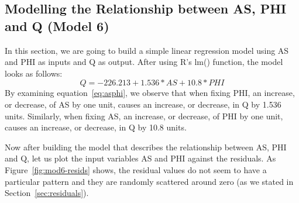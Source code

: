 \documentclass[a4paper,12pt, english]{article}
\begin{document}
\subsection{Modelling the Relationship between AS, PHI and Q (Model 6)} \label{sec:asphimodel}
In this section, we are going to build a simple linear regression model using AS and PHI as inputs and Q as output. After using R's lm() function, the model looks as follows:\\
\begin{equation}
\label{eq:asphi}
Q = -226.213  +      1.536*AS   +    10.8*PHI
\end{equation}       
By examining equation~\ref{eq:asphi}, we observe that when fixing PHI, an increase, or decrease, of AS by one unit, causes an increase, or decrease, in Q by 1.536 units.
Similarly, when fixing AS, an increase, or decrease, of PHI by one unit, causes an increase, or decrease, in Q by 10.8 units.

Now after building the model that describes the relationship between AS, PHI and Q, let us plot the input variables AS and PHI against the residuals. As Figure~\ref{fig:mod6-resids} shows, the residual values do not seem to have a particular pattern and they are randomly scattered around zero (as we stated in Section~\ref{sec:residuals}).
\end{document}
